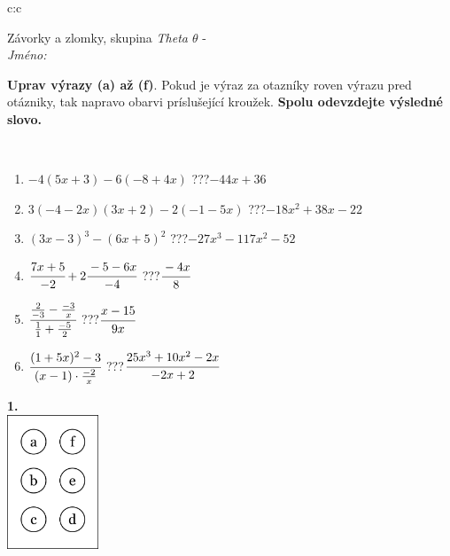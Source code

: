 \documentclass[10pt]{report}
\begin{document}
\begin{tabular}{c:c}
\begin{minipage}[c][104.5mm][t]{0.5\linewidth}
\begin{center}
\vspace{7mm}
{\huge Závorky a zlomky, skupina \textit{Theta $\theta$} -}\\[5mm]
\textit{Jméno:}\phantom{xxxxxxxxxxxxxxxxxxxxxxxxxxxxxxxxxxxxxxxxxxxxxxxxxxxxxxxxxxxxxxxxx}\\[5mm]
\begin{minipage}{0.95\linewidth}
\begin{center}
\textbf{Uprav výrazy (a) až (f)}. Pokud je výraz za otazníky roven výrazu pred otázniky, tak napravo obarvi príslušející kroužek. \textbf{Spolu odevzdejte výsledné slovo.}
\end{center}
\end{minipage}
\\[1mm]
\begin{minipage}{0.79\linewidth}
\begin{center}
\begin{varwidth}{\linewidth}
\begin{enumerate}
\normalsize
\item $-4(5x+3)-6(-8+4x)$\quad \dotfill\; ???\;\dotfill \quad $-44x+36$
\item $3(-4-2x)(3x+2)-2(-1-5x)$\quad \dotfill\; ???\;\dotfill \quad $-18x^2+38x-22$
\item $(3x-3)^3-(6x+5)^2$\quad \dotfill\; ???\;\dotfill \quad $-27x^3-117x^2-52$
\item $\cfrac{7x+5}{-2}+2\cfrac{-5-6x}{-4}$\quad \dotfill\; ???\;\dotfill \quad $\cfrac{-4x}{8}$
\item $\cfrac{\frac{2}{-3}-\frac{-3}{x}}{\frac{1}{1}+\frac{-5}{2}}$\quad \dotfill\; ???\;\dotfill \quad $\cfrac{x-15}{9x}$
\item $\cfrac{(1+5x)^2-3}{(x-1)\cdot\frac{-2}{x}}$\quad \dotfill\; ???\;\dotfill \quad $\cfrac{25x^3+10x^2-2x}{-2x+2}$
\end{enumerate}
\end{varwidth}
\end{center}
\end{minipage}
\begin{minipage}{0.20\linewidth}
\begin{center}
{\Huge\bfseries 1.} \\[2mm]
\includegraphics[height=40mm]{../images/braille.png}

\end{center}
\end{minipage}
\end{center}
\end{minipage}
\end{tabular}
\end{document}
